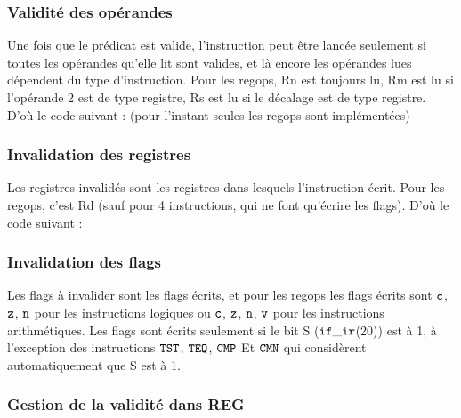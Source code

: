\documentclass{article}
\begin{document}


\subsubsection{Validité des opérandes}

Une fois que le prédicat est valide, l'instruction peut être lancée seulement si toutes les opérandes
qu'elle lit sont valides, et là encore les opérandes lues dépendent du type d'instruction.
Pour les regops, Rn est toujours lu, Rm est lu si l'opérande 2 est de type registre,
Rs est lu si le décalage est de type registre. D'où le code suivant :
(pour l'instant seules les regops sont implémentées)



\subsubsection{Invalidation des registres}

Les registres invalidés sont les registres dans lesquels l'instruction écrit.
Pour les regops, c'est Rd (sauf pour 4 instructions, qui ne font qu'écrire les flags).
D'où le code suivant :



\subsubsection{Invalidation des flags}

Les flags à invalider sont les flags écrits, et pour les regops les flags écrits
sont $\tt{c}$, $\tt{z}$, $\tt{n}$ pour les instructions logiques
ou $\tt{c}$, $\tt{z}$, $\tt{n}$, $\tt{v}$ pour les
instructions arithmétiques.
Les flags sont écrits seulement si le bit S ($\tt{if\_ir}$(20)) est à 1, à l'exception des instructions
$\tt{TST}$, $\tt{TEQ}$, $\tt{CMP}$ Et $\tt{CMN}$ qui considèrent
automatiquement que S est à 1.



\subsubsection{Gestion de la validité dans REG}
\end{document}
